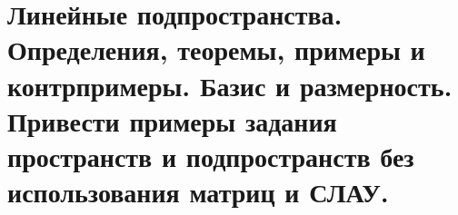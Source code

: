 \section{
    Линейные подпространства. Определения, теоремы, примеры и контрпримеры. Базис и размерность. Привести примеры задания пространств и подпространств без использования матриц и СЛАУ.
}




\newpage





\newpage



